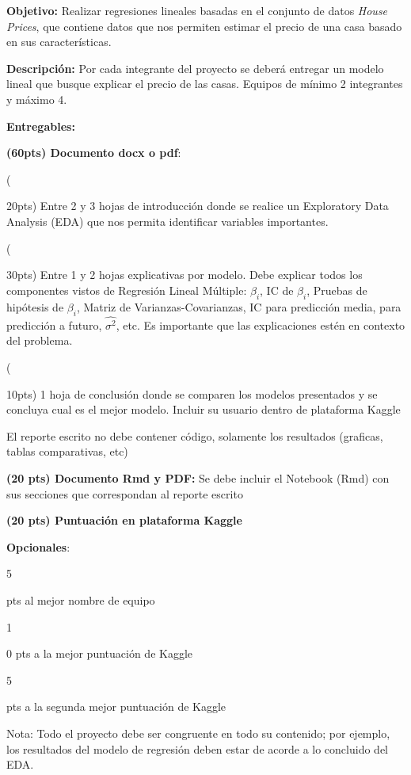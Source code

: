 \documentclass{../oxmathproblems}
\newcommand{\SubItem}[1]{
    {\setlength\itemindent{15pt} \item[-] #1}
}
\begin{document}
\textbf{Objetivo:} Realizar regresiones lineales basadas en el conjunto de datos \textit{House Prices}, que contiene datos que nos permiten estimar el precio de una casa basado en sus características.

\qquad

\textbf{Descripción:} Por cada integrante del proyecto se deberá entregar un modelo lineal que busque explicar el precio de las casas. Equipos de mínimo 2 integrantes y máximo 4.

\qquad

\textbf{Entregables:}

\begin{itemize}

\item \textbf{(60pts) Documento docx o pdf}: 
\SubItem (20pts) Entre 2 y 3 hojas de introducción donde se realice un Exploratory Data Analysis (EDA) que nos permita identificar variables importantes.
\SubItem (30pts) Entre 1 y 2 hojas explicativas por modelo. Debe explicar todos los componentes vistos de Regresión Lineal Múltiple: $\hat{\beta_i}$, IC de $\beta_i$, Pruebas de hipótesis de $\beta_i$, Matriz de Varianzas-Covarianzas, IC para predicción media, para predicción a futuro, $\hat{\sigma^2}$, etc. Es importante que las explicaciones estén en contexto del problema.
\SubItem (10pts) 1 hoja de conclusión donde se comparen los modelos presentados y se concluya cual es el mejor modelo. Incluir su usuario dentro de plataforma Kaggle

El reporte escrito no debe contener código, solamente los resultados (graficas, tablas comparativas, etc) 

\item \textbf{(20 pts) Documento Rmd  y PDF:} Se debe incluir el Notebook (Rmd) con sus secciones que correspondan al reporte escrito

\item \textbf{(20 pts) Puntuación en plataforma Kaggle}

\item \textbf{Opcionales}: 
\SubItem 5 pts al mejor nombre de equipo
\SubItem 10 pts a la mejor puntuación de Kaggle
\SubItem 5 pts a la segunda mejor puntuación de Kaggle

\end{itemize}

Nota: Todo el proyecto debe ser congruente en todo su contenido; por ejemplo, los resultados del modelo de regresión deben estar de acorde a lo concluido del EDA.

\newpage
\end{document}
